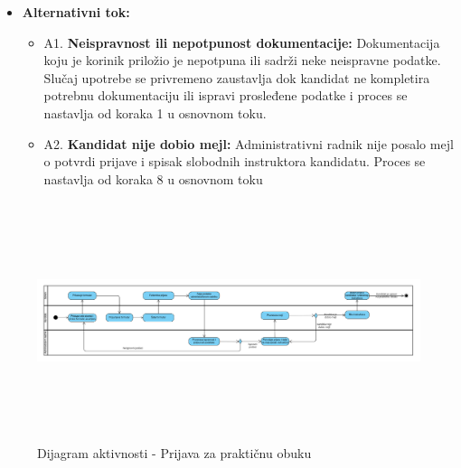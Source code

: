 \begin{itemize}
\item \textbf{Alternativni tok:}  
   \begin{itemize}
   \item A1. \textbf{Neispravnost ili nepotpunost dokumentacije:}
  Dokumentacija koju je korinik priložio je nepotpuna ili sadrži neke neispravne podatke. Slučaj upotrebe se privremeno zaustavlja dok kandidat ne kompletira potrebnu dokumentaciju ili ispravi prosleđene podatke i proces se nastavlja od koraka 1 u osnovnom toku.
  \item A2. \textbf{Kandidat nije dobio mejl:}
  Administrativni radnik nije posalo mejl o potvrdi prijave i spisak slobodnih instruktora kandidatu. Proces se nastavlja od koraka 8 u osnovnom toku
   \end{itemize}

\end{itemize}  

\begin{figure}[H]
  \begin{center}
      \includegraphics[width=140mm, height=70mm]{Diagrams/dijagram_aktivnosti_prijava_za_prakticnu_obuku.png}
  \end{center}
  \caption {Dijagram aktivnosti - Prijava za praktičnu obuku}
  \label{activity_prijava_za_prakticnu_obuku}

\end{figure}
